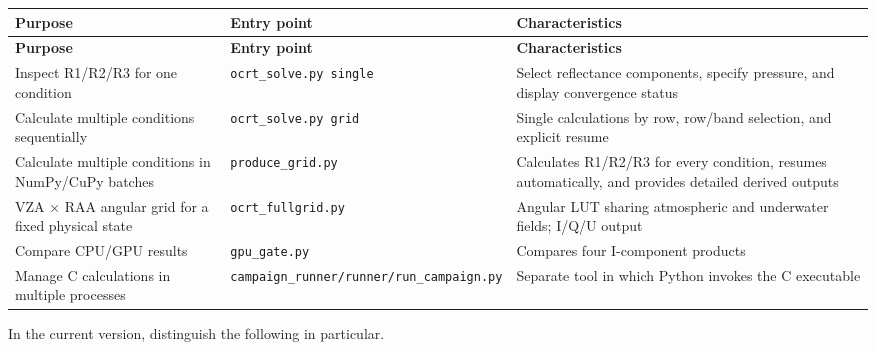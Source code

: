 {\TableFont
\begin{longtable}{@{}>{\raggedright\arraybackslash}p{}>{\raggedright\arraybackslash}p{}>{\raggedright\arraybackslash}p{}@{}}
\toprule
\textbf{Purpose} & \textbf{Entry point} & \textbf{Characteristics} \\
\midrule
\endfirsthead
\toprule
\textbf{Purpose} & \textbf{Entry point} & \textbf{Characteristics} \\
\midrule
\endhead
\bottomrule
\endfoot
Inspect R1/R2/R3 for one condition & \texttt{ocrt\_\allowbreak{}solve.\allowbreak{}py single} & Select reflectance components, specify pressure, and display convergence status \\
Calculate multiple conditions sequentially & \texttt{ocrt\_\allowbreak{}solve.\allowbreak{}py grid} & Single calculations by row, row/band selection, and explicit resume \\
Calculate multiple conditions in NumPy/CuPy batches & \texttt{produce\_\allowbreak{}grid.\allowbreak{}py} & Calculates R1/R2/R3 for every condition, resumes automatically, and provides detailed derived outputs \\
VZA \ensuremath{\times} RAA angular grid for a fixed physical state & \texttt{ocrt\_\allowbreak{}fullgrid.\allowbreak{}py} & Angular LUT sharing atmospheric and underwater fields; I/Q/U output \\
Compare CPU/GPU results & \texttt{gpu\_\allowbreak{}gate.\allowbreak{}py} & Compares four I-component products \\
Manage C calculations in multiple processes & \texttt{campaign\_\allowbreak{}runner/\allowbreak{}runner/\allowbreak{}run\_\allowbreak{}campaign.\allowbreak{}py} & Separate tool in which Python invokes the C executable \\
\end{longtable}
}

In the current version, distinguish the following in particular.

